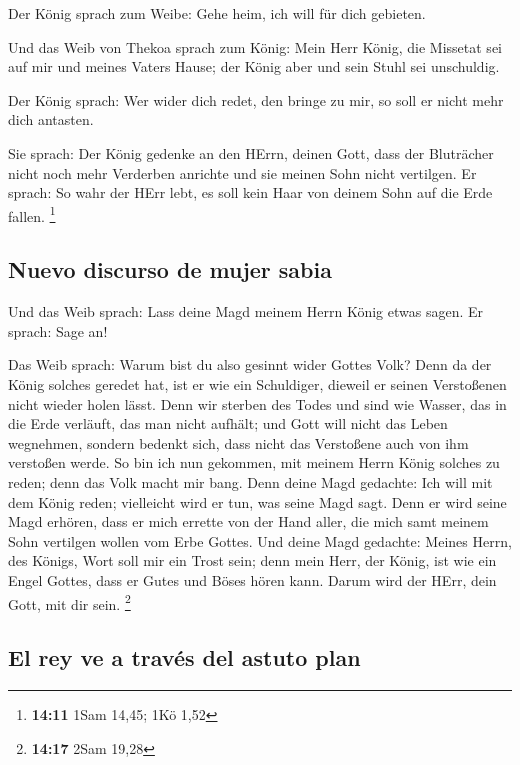  Der König sprach zum Weibe: Gehe heim, ich will für dich
gebieten.

 Und das Weib von Thekoa sprach zum König: Mein Herr
König, die Missetat sei auf mir und meines Vaters Hause; der König aber
und sein Stuhl sei unschuldig.

 Der König sprach: Wer wider dich redet, den bringe zu
mir, so soll er nicht mehr dich antasten.

 Sie sprach: Der König gedenke an den HErrn, deinen Gott,
dass der Bluträcher nicht noch mehr Verderben anrichte und sie meinen
Sohn nicht vertilgen. Er sprach: So wahr der HErr lebt, es soll kein
Haar von deinem Sohn auf die Erde fallen. \footnote{\textbf{14:11} 1Sam
  14,45; 1Kö 1,52}

\hypertarget{nuevo-discurso-de-mujer-sabia}{%
\subsection{Nuevo discurso de mujer
sabia}\label{nuevo-discurso-de-mujer-sabia}}

 Und das Weib sprach: Lass deine Magd meinem Herrn König
etwas sagen. Er sprach: Sage an!

 Das Weib sprach: Warum bist du also gesinnt wider Gottes
Volk? Denn da der König solches geredet hat, ist er wie ein Schuldiger,
dieweil er seinen Verstoßenen nicht wieder holen lässt. 
Denn wir sterben des Todes und sind wie Wasser, das in die Erde
verläuft, das man nicht aufhält; und Gott will nicht das Leben
wegnehmen, sondern bedenkt sich, dass nicht das Verstoßene auch von ihm
verstoßen werde.  So bin ich nun gekommen, mit meinem
Herrn König solches zu reden; denn das Volk macht mir bang. Denn deine
Magd gedachte: Ich will mit dem König reden; vielleicht wird er tun, was
seine Magd sagt.  Denn er wird seine Magd erhören, dass
er mich errette von der Hand aller, die mich samt meinem Sohn vertilgen
wollen vom Erbe Gottes.  Und deine Magd gedachte: Meines
Herrn, des Königs, Wort soll mir ein Trost sein; denn mein Herr, der
König, ist wie ein Engel Gottes, dass er Gutes und Böses hören kann.
Darum wird der HErr, dein Gott, mit dir sein. \footnote{\textbf{14:17}
  2Sam 19,28}

\hypertarget{el-rey-ve-a-travuxe9s-del-astuto-plan}{%
\subsection{El rey ve a través del astuto
plan}\label{el-rey-ve-a-travuxe9s-del-astuto-plan}}

